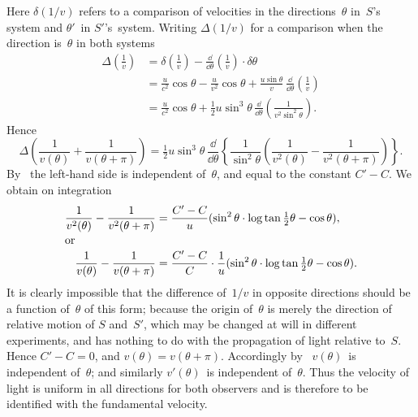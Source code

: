 \documentclass[12pt]{book}
\begin{document}
Here $\delta(1/v)$ refers to a comparison of velocities in the directions~$\theta$ in~$S$'s
system and $\theta'$~in $S'$'s~system. Writing $\Delta(1/v)$ for a comparison when the
direction is~$\theta$ in both systems
\begin{align*}
  \Delta\left(\frac{1}{v}\right)
  &= \delta\left(\frac{1}{v}\right) - \frac{\dd}{\dd\theta}\left(\frac{1}{v}\right)\cdot\delta\theta\\
  &= \frac{u}{c^2} \cos\theta - \frac{u}{v^2} \cos\theta + \frac{u\sin\theta}{v}\, \frac{\dd}{\dd\theta}\left(\frac{1}{v}\right) \\
  &= \frac{u}{c^2} \cos\theta + \tfrac{1}{2} u \sin^{3}\theta\, \frac{\dd}{\dd\theta} \left(\frac{1}{v^2 \sin^2\theta}\right).
\end{align*}
Hence
\[
\Delta\left(\frac{1}{v(\theta)} + \frac{1}{v(\theta + \pi)}\right)
= \tfrac{1}{2} u\sin^{3}\theta\, \frac{\dd}{\dd\theta}\left\{\frac{1}{\sin^2\theta}\left(\frac{1}{v^2(\theta)} - \frac{1}{v^2(\theta + \pi)}\right)\right\}.
\]
By~ the left-hand side is independent of~$\theta$, and equal to the constant
$C' - C$. We obtain on integration
\begin{align*}
  \frac{1}{v^2(\theta)} - \frac{1}{v^2(\theta + \pi)}
  &= \frac{C' - C}{u} (\sin^{2}\theta\cdot\log\tan \tfrac{1}{2}\theta - \cos\theta), \\
\intertext{or}
  \frac{1}{v(\theta)} - \frac{1}{v(\theta + \pi)}
  &= \frac{C' - C}{C} \cdot \frac{1}{u} (\sin^{2}\theta \cdot \log\tan \tfrac{1}{2}\theta - \cos\theta).
\end{align*}
It is clearly impossible that the difference of~$1/v$ in opposite directions should
be a function of~$\theta$ of this form; because the origin of~$\theta$ is merely the direction
of relative motion of $S$ and~$S'$, which may be changed at will in different
experiments, and has nothing to do with the propagation of light relative to~$S$.
Hence $C' - C = 0$, and $v(\theta) = v(\theta + \pi)$. Accordingly by~ $v(\theta)$~is independent
of~$\theta$; and similarly $v'(\theta)$~is independent of~$\theta$. Thus the velocity of
light is uniform in all directions for both observers and is therefore to be
identified with the fundamental velocity.
\end{document}
